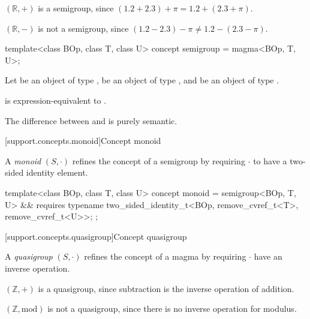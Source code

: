 \pnum
\begin{example}
   $(\mathbb{R}, +)$ is a semigroup, since $(1.2 + 2.3) + \pi = 1.2 + (2.3 + \pi)$.
\end{example}

\pnum
\begin{example}
   $(\mathbb{R}, -)$ is not a semigroup, since $(1.2 - 2.3) - \pi \neq 1.2 - (2.3 - \pi)$.
\end{example}

\begin{itemdecl}
  template<class BOp, class T, class U>
  concept semigroup = magma<BOp, T, U>;
\end{itemdecl}
\begin{itemdescr}
   \pnum
   Let  be an object of type ,  be an object of type , and
    be an object of type .

   \pnum
    is expression-equivalent to
   .

   \pnum
   \begin{note}
      The difference between  and  is purely semantic.
   \end{note}
\end{itemdescr}

[support.concepts.monoid]{Concept monoid}

\pnum
A \textit{monoid} $(S, \cdot)$ refines the concept of a semigroup by requiring $\cdot$ to have a
two-sided identity element.

\begin{itemdecl}
  template<class BOp, class T, class U>
  concept monoid = semigroup<BOp, T, U> && requires {
    typename two_sided_identity_t<BOp, remove_cvref_t<T>, remove_cvref_t<U>>;
  };
\end{itemdecl}

[support.concepts.quasigroup]{Concept quasigroup}

\pnum
A \textit{quasigroup} $(S, \cdot)$ refines the concept of a magma by requiring $\cdot$ have an
inverse operation.

\begin{example}
   $(\mathbb{Z}, +)$ is a quasigroup, since subtraction is the inverse operation of addition.
\end{example}

\begin{example}
   $(\mathbb{Z}, \text{mod})$ is not a quasigroup, since there is no inverse operation for modulus.
\end{example}

